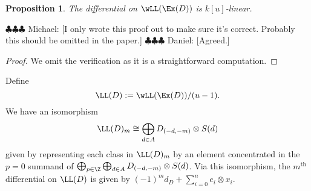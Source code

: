 \documentclass[12pt]{amsart}
\newtheorem{prop}[lemma]{Proposition}
\theoremstyle{definition}
\theoremstyle{remark}
\newcommand{\daniel}[1]{{\color{blue} \sf $\clubsuit\clubsuit\clubsuit$ Daniel: [#1]}}
\newcommand{\michael}[1]{{\color{red} \sf $\clubsuit\clubsuit\clubsuit$ Michael: [#1]}}
\def\on{\operatorname}
\def\th{\on{th}}
\begin{document}
\begin{prop}
\label{ulinear}
The differential on $\wLL(\Ex(D))$ is $k[u]$-linear.
\end{prop}
\michael{I only wrote this proof out to make sure it's correct. Probably this should be omitted in the paper.}\daniel{Agreed.}
\begin{proof}
We omit the verification as it is a straightforward computation.
\iffalse
I'm writing down the proof to make sure I got the sign right in the definition of the $u$-action. We prove that the action of $u$ commutes with both horizontal and vertical differentials. Write $d_D$ for the differential on $D$ and $d_K$ for the dual Koszul differential. We have
\begin{align*}
d_{\on{hor}}(u \cdot (\dots, t_{-1}, t_0, t_1, \dots)) &= d_{\on{hor}}(\dots, (-1)^{m-1}t_{-2}, (-1)^{m} t_{-1}, (-1)^{m-1}t_0, \dots) \\
&= (\dots, (-1)^{m}d_T(t_{-3}), (-1)^{m-1} d_T(t_{-2}), (-1)^{m}d_T(t_{-1}), \dots) \\
&= u \cdot (\dots, d_T(t_{-2}),  d_T(t_{-1}), d_T(t_{0}), \dots) \\
& = u \cdot d_{\on{hor}} (\dots, t_{-1}, t_0, t_1, \dots),
\end{align*}
and 
\begin{align*}
d_{\on{ver}}(u \cdot (\dots, t_{-1}, t_0, t_1, \dots)) &= d_{\on{ver}}(\dots, (-1)^{m-1}t_{-2}, (-1)^{m} t_{-1}, (-1)^{m-1}t_0, \dots) \\
&= (\dots, (-1)^{m}d_K(t_{-2}), (-1)^{m} d_K(t_{-1}), (-1)^{m}d_K(t_{0}), \dots) \\
&= u \cdot (\dots, -d_K(t_{-1}),  d_K(t_{0}), -d_K(t_{1}), \dots) \\
& = u \cdot d_{\on{ver}} (\dots, t_{-1}, t_0, t_1, \dots).
\end{align*}
\fi
\end{proof}

Define 
$$
\LL(D) := \wLL(\Ex(D)) / (u - 1).
$$
We have an isomorphism
\begin{equation}
\label{iso}
\LL(D)_m \cong \bigoplus_{d \in A} D_{(-d, -m)} \otimes S(d)
\end{equation}
given by representing each class in $\LL(D)_m$ by an element concentrated in the $p = 0$ summand of $\bigoplus_{p \in \Z}  \bigoplus_{d \in A} D_{(-d, -m)} \otimes S(d)$. Via this isomorphism, the $m^{\th}$ differential on $\LL(D)$ is given by $(-1)^{m}d_D + \sum_{i = 0}^n e_i \otimes x_i$.

\fi
\end{document}
